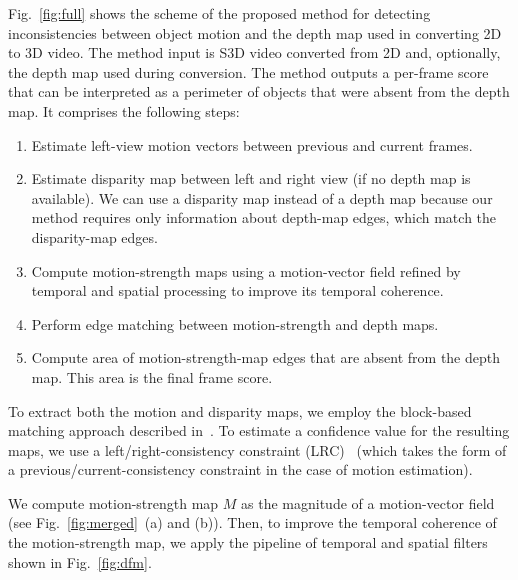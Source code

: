 \documentclass[14pt, a4paper]{extarticle}
\begin{document}
Fig.~\ref{fig:full} shows the scheme of the proposed method for detecting inconsistencies 
between object motion and the depth map used in converting 2D to 3D video. The method input is S3D 
video converted from 2D and, optionally, the depth map used during conversion. The method outputs 
a per-frame score that can be interpreted as a perimeter of objects that were absent from the depth map. 
It comprises the following steps:
\begin{enumerate}
	\item Estimate left-view motion vectors between previous and current frames.
	\item Estimate disparity map between left and right view (if no depth map is available). 
	We can use a disparity map instead of a depth map because our method requires only 
	information about depth-map edges, which match the disparity-map edges.
	\item Compute motion-strength maps using a motion-vector field refined by temporal 
	and spatial processing to improve its temporal coherence.
	\item Perform edge matching between motion-strength and depth maps.
	\item Compute area of motion-strength-map edges that are absent from the depth map. 
	This area is the final frame score.
\end{enumerate}



To extract both the motion and disparity maps, we employ the block-based matching approach 
described in~\cite{simonyan2008fast}. To estimate a confidence value for the resulting maps, 
we use a left\slash right-consistency constraint (LRC)~\cite{egnal2004stereo} 
(which takes the form of a previous\slash current-consistency constraint in the case of motion estimation).

We compute motion-strength map $M$ as the magnitude of a motion-vector field (see Fig.~\ref{fig:merged}~(a) and (b)).
Then, to improve the temporal coherence of the motion-strength map, we apply the pipeline
of temporal and spatial filters shown in Fig.~\ref{fig:dfm}.
\end{document}
